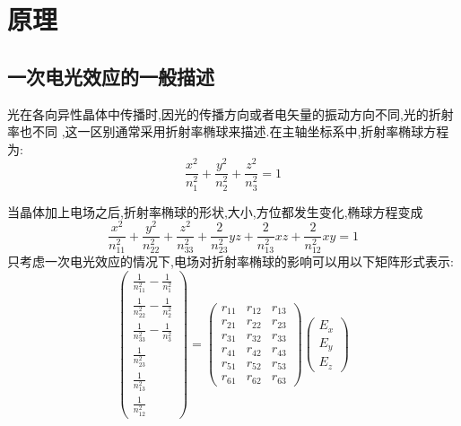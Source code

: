 \documentclass[aps,pre,12pt,preprint,onecolumn,showpacs,showkeys]{revtex4-1}
\begin{document}
\section{原理}

\subsection{一次电光效应的一般描述}

光在各向异性晶体中传播时,因光的传播方向或者电矢量的振动方向不同,光的折射率也不同
,这一区别通常采用折射率椭球来描述.在主轴坐标系中,折射率椭球方程为:
\begin{equation}
    \frac{x^2}{n_1^2} + \frac{y^2}{n_2^2} +  \frac{z^2}{n_3^2} = 1
\end{equation}

当晶体加上电场之后,折射率椭球的形状,大小,方位都发生变化,椭球方程变成
\begin{equation}
    \frac{x^2}{n_{11}^2} + \frac{y^2}{n_{22}^2} + \frac{z^2}{n_{33}^2} +
    \frac{2}{n_{23}^2}yz + \frac{2}{n_{13}^2}xz + \frac{2}{n_{12}^2}xy = 1
\end{equation}
只考虑一次电光效应的情况下,电场对折射率椭球的影响可以用以下矩阵形式表示:
\begin{equation}
    \begin{pmatrix}
        \frac{1}{n_{11}^2} - \frac{1}{n_1^2} \\
        \frac{1}{n_{22}^2} - \frac{1}{n_2^2} \\
        \frac{1}{n_{33}^2} - \frac{1}{n_3^2} \\
        \frac{1}{n_{23}^2} \\
        \frac{1}{n_{13}^2} \\
        \frac{1}{n_{12}^2}
    \end{pmatrix}
    = \begin{pmatrix}
        r_{11} & r_{12}  & r_{13} \\
        r_{21} & r_{22}  & r_{23} \\
        r_{31} & r_{32}  & r_{33} \\
        r_{41} & r_{42}  & r_{43} \\
        r_{51} & r_{52}  & r_{53} \\
        r_{61} & r_{62}  & r_{63} 
    \end{pmatrix}
    \begin{pmatrix}
        E_x \\
        E_y \\
        E_z
    \end{pmatrix}
\end{equation}\cite{Book}
\end{document}
